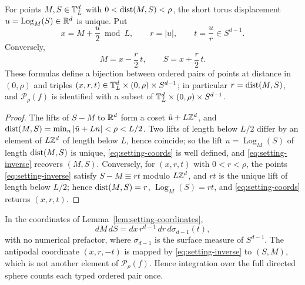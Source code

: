 \begin{lemma}\label{lem:setting-coordinates}
For points $M,S\in\mathbb T^d_L$ with $0<\operatorname{dist}(M,S)<\rho$, the short torus displacement $u=\operatorname{Log}_M(S)\in\mathbb R^d$ is unique. Put
\begin{equation}\label{eq:setting-coords}
x=M+\frac u2\bmod L,\qquad r=|u|,\qquad t=\frac ur\in S^{d-1}.
\end{equation}
Conversely,
\begin{equation}\label{eq:setting-inverse}
M=x-\frac r2\,t,\qquad S=x+\frac r2\,t .
\end{equation}
These formulas define a bijection between ordered pairs of points at distance in $(0,\rho)$ and triples $(x,r,t)\in\mathbb T^d_L\times(0,\rho)\times S^{d-1}$; in particular $r=\operatorname{dist}(M,S)$, and $\mathcal P_\rho(f)$ is identified with a subset of $\mathbb T^d_L\times(0,\rho)\times S^{d-1}$.
\end{lemma}

\begin{proof}
The lifts of $S-M$ to $\mathbb R^d$ form a coset $\tilde u+L\mathbb Z^d$, and $\operatorname{dist}(M,S)=\min_{n}|\tilde u+Ln|<\rho<L/2$. Two lifts of length below $L/2$ differ by an element of $L\mathbb Z^d$ of length below $L$, hence coincide; so the lift $u=\operatorname{Log}_M(S)$ of length $\operatorname{dist}(M,S)$ is unique, \eqref{eq:setting-coords} is well defined, and \eqref{eq:setting-inverse} recovers $(M,S)$. Conversely, for $(x,r,t)$ with $0<r<\rho$, the points \eqref{eq:setting-inverse} satisfy $S-M\equiv rt$ modulo $L\mathbb Z^d$, and $rt$ is the unique lift of length below $L/2$; hence $\operatorname{dist}(M,S)=r$, $\operatorname{Log}_M(S)=rt$, and \eqref{eq:setting-coords} returns $(x,r,t)$.
\end{proof}

\begin{proposition}\label{prop:setting-jacobian}
In the coordinates of Lemma~\ref{lem:setting-coordinates},
\begin{equation}\label{eq:setting-dMdS}
dM\,dS=dx\,r^{d-1}\,dr\,d\sigma_{d-1}(t),
\end{equation}
with no numerical prefactor, where $\sigma_{d-1}$ is the surface measure of $S^{d-1}$. The antipodal coordinate $(x,r,-t)$ is mapped by \eqref{eq:setting-inverse} to $(S,M)$, which is not another element of $\mathcal P_\rho(f)$. Hence integration over the full directed sphere counts each typed ordered pair once.
\end{proposition}

